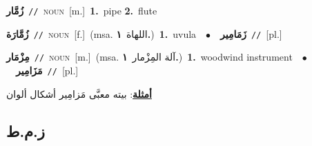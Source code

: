 \documentclass[10pt,a4paper,twoside]{article} %
\begin{document}
\begin{multicols}{2}
{\setlength\topsep{0pt}\textbf{\foreignlanguage{arabic}{زُمَّار}}\ {\color{gray}\texttt{//}\color{black}}\ \textsc{noun}\ [m.]\ \textbf{1.}~pipe  \textbf{2.}~flute\ } \vspace{2mm}

{\setlength\topsep{0pt}\textbf{\foreignlanguage{arabic}{زُمَّارَة}}\ {\color{gray}\texttt{//}\color{black}}\ \textsc{noun}\ [f.]\ \color{gray}(msa. \foreignlanguage{arabic}{اللهاة}~\foreignlanguage{arabic}{\textbf{١.}})\color{black}\ \textbf{1.}~uvula\ \ $\bullet$\ \ \setlength\topsep{0pt}\textbf{\foreignlanguage{arabic}{زَمَامِير}}\ {\color{gray}\texttt{//}\color{black}}\ [pl.]\ } \vspace{2mm}

{\setlength\topsep{0pt}\textbf{\foreignlanguage{arabic}{مِزْمَار}}\ {\color{gray}\texttt{//}\color{black}}\ \textsc{noun}\ [m.]\ \color{gray}(msa. \foreignlanguage{arabic}{آلة المِزْمار}~\foreignlanguage{arabic}{\textbf{١.}})\color{black}\ \textbf{1.}~woodwind instrument\ \ $\bullet$\ \ \setlength\topsep{0pt}\textbf{\foreignlanguage{arabic}{مَزَامِير}}\ {\color{gray}\texttt{//}\color{black}}\ [pl.]\  \begin{flushright}\color{gray}\foreignlanguage{arabic}{\textbf{\underline{\foreignlanguage{arabic}{أمثلة}}}: بيته معبَّى مَزامِير أشكال ألوان}\end{flushright}\color{black}} \vspace{2mm}

\vspace{-3mm}
\subsection*{\color{blue}\foreignlanguage{arabic}{ز.م.ط}\color{blue}{}} 


\end{multicols}
\end{document}
